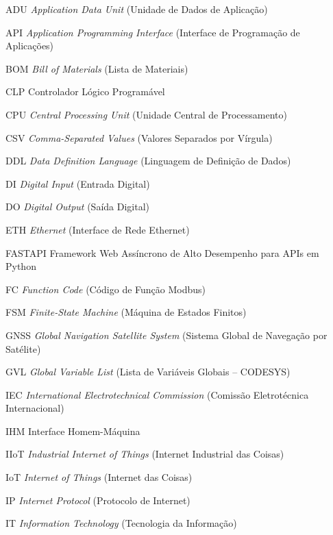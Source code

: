 
\begin{siglas}
  \item[ADU] \textit{Application Data Unit} (Unidade de Dados de Aplicação)
  \item[API] \textit{Application Programming Interface} (Interface de Programação de Aplicações)
  \item[BOM] \textit{Bill of Materials} (Lista de Materiais)
  \item[CLP] Controlador Lógico Programável
  \item[CPU] \textit{Central Processing Unit} (Unidade Central de Processamento)
  \item[CSV] \textit{Comma-Separated Values} (Valores Separados por Vírgula)
  \item[DDL] \textit{Data Definition Language} (Linguagem de Definição de Dados)
  \item[DI] \textit{Digital Input} (Entrada Digital)
  \item[DO] \textit{Digital Output} (Saída Digital)
  \item[ETH] \textit{Ethernet} (Interface de Rede Ethernet)
  \item[FASTAPI] Framework Web Assíncrono de Alto Desempenho para APIs em Python
  \item[FC] \textit{Function Code} (Código de Função Modbus)
  \item[FSM] \textit{Finite-State Machine} (Máquina de Estados Finitos)
  \item[GNSS] \textit{Global Navigation Satellite System} (Sistema Global de Navegação por Satélite)
  \item[GVL] \textit{Global Variable List} (Lista de Variáveis Globais -- CODESYS)
  \item[IEC] \textit{International Electrotechnical Commission} (Comissão Eletrotécnica Internacional)
  \item[IHM] Interface Homem-Máquina
  \item[IIoT] \textit{Industrial Internet of Things} (Internet Industrial das Coisas)
  \item[IoT] \textit{Internet of Things} (Internet das Coisas)
  \item[IP] \textit{Internet Protocol} (Protocolo de Internet)
  \item[IT] \textit{Information Technology} (Tecnologia da Informação)

\end{siglas}
